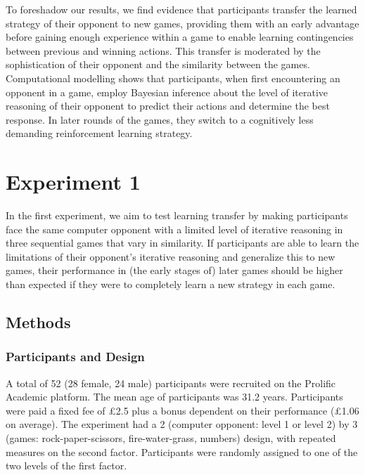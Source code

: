 \documentclass[smallextended]{svjour3}       %
\begin{document}
To foreshadow our results, we find evidence that participants transfer
the learned strategy of their opponent to new games, providing them with
an early advantage before gaining enough experience within a game to
enable learning contingencies between previous and winning actions. This
transfer is moderated by the sophistication of their opponent and the
similarity between the games. Computational modelling shows that
participants, when first encountering an opponent in a game, employ
Bayesian inference about the level of iterative reasoning of their
opponent to predict their actions and determine the best response. In
later rounds of the games, they switch to a cognitively less demanding
reinforcement learning strategy.

\hypertarget{experiment-1}{%
\section{Experiment 1}\label{experiment-1}}

In the first experiment, we aim to test learning transfer by making
participants face the same computer opponent with a limited level of
iterative reasoning in three sequential games that vary in similarity.
If participants are able to learn the limitations of their opponent's
iterative reasoning and generalize this to new games, their performance
in (the early stages of) later games should be higher than expected if
they were to completely learn a new strategy in each game.

\hypertarget{methods}{%
\subsection{Methods}\label{methods}}

\hypertarget{participants-and-design}{%
\subsubsection{Participants and Design}\label{participants-and-design}}

A total of 52 (28 female, 24 male) participants were recruited on the
Prolific Academic platform. The mean age of participants was 31.2 years.
Participants were paid a fixed fee of £2.5 plus a bonus dependent on
their performance (£1.06 on average). The experiment had a 2 (computer
opponent: level 1 or level 2) by 3 (games: rock-paper-scissors,
fire-water-grass, numbers) design, with repeated measures on the second
factor. Participants were randomly assigned to one of the two levels of
the first factor.
\end{document}
